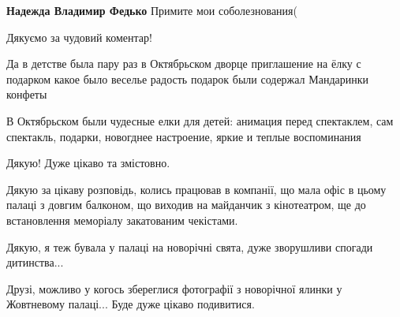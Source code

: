 \begin{itemize}
\begin{itemize}
\textbf{Надежда Владимир Федько} Примите мои соболезнования(
\end{itemize} %

Дякуємо за чудовий коментар!


Да в детстве была пару раз в Октябрьском дворце приглашение на ёлку с подарком
какое было веселье радость подарок были содержал Мандаринки конфеты


В Октябрьском были чудесные елки для детей: анимация перед спектаклем, сам
спектакль, подарки, новогднее настроение, яркие и теплые воспоминания


Дякую! Дуже цікаво та змістовно.


Дякую за цікаву розповідь, колись працював в компанії, що мала офіс в цьому
палаці з довгим балконом, що виходив на майданчик з кінотеатром, ще до
встановлення меморіалу закатованим чекістами.


Дякую, я теж бувала у палаці на новорічні свята, дуже зворушливи спогади дитинства...


Друзі, можливо у когось збереглися фотографії з новорічної ялинки у Жовтневому
палаці...  Буде дуже цікаво подивитися.

\end{itemize} %
